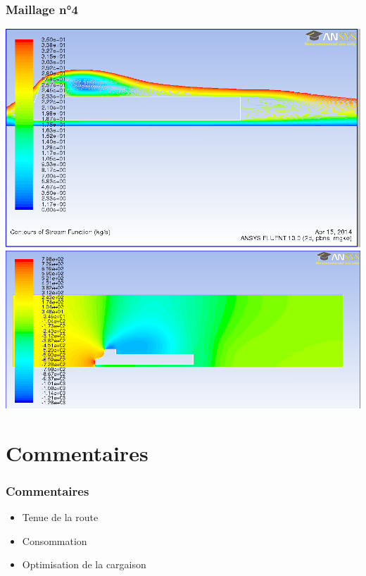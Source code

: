 \documentclass[handout]{beamer}
\begin{document}
\begin{frame}
	\frametitle{Maillage n°4}
	\begin{center}
	\includegraphics[scale=0.21]{../resultsCx/remorque3_110stream.png}\\
	\includegraphics[scale=0.21]{../resultsCx/rem3_press_110.png}
	\end{center}
\end{frame}

\section{Commentaires}
\begin{frame}
	\frametitle{Commentaires}
	\begin{itemize}
		\item Tenue de la route
		\item Consommation
		\item Optimisation de la cargaison
	\end{itemize}
\end{frame}
\end{document}
